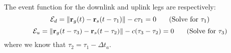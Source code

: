 \documentclass[english]{article}
\begin{document}
The event function for the downlink and uplink legs are
respectively:
%
\begin{equation}
   \mathcal{E}_d = \| \mathbf{r}_g(t) - \mathbf{r}_s(t - \tau_1)\| - c \tau_1 = 0 \hspace{.25 in} \mbox{(Solve for $\tau_1$)}
\end{equation}
%
\begin{equation}
   \mathcal{E}_u = \| \mathbf{r}_g(t - \tau_3) - \mathbf{r}_s(t - \tau_2)\| - c (\tau_3 - \tau_2) = 0 \hspace{.25 in} \mbox{(Solve for $\tau_3$)}
\end{equation}
%
where we know that $\tau_2 = \tau_1 - \Delta t_a$.
\end{document}
